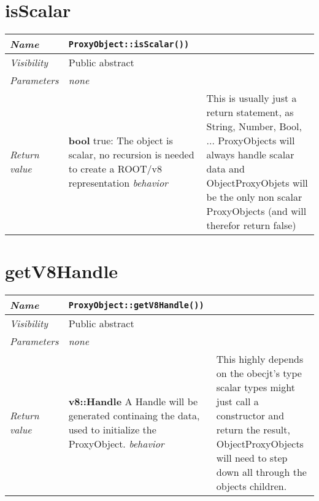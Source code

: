 \section{isScalar}
\begin{longtable}{p{3cm} @{\hskip 1cm} p{12cm}}
  \hline
  \textit{Name} & \texttt{ProxyObject::isScalar())} \\
  \hline
  \textit{Visibility} & Public abstract \\
  \hline
  \textit{Parameters} & \textit{none} \\
  \hline
  \textit{Return value} & \textbf{bool} true: The object is scalar, no recursion is needed to create a ROOT/v8 representation
  \hline
  \textit{behavior} & This is usually just a return statement, as String, Number, Bool, ... ProxyObjects will always handle scalar data and ObjectProxyObjets will be the only non scalar ProxyObjects (and will therefor return false) \\
  \hline
\end{longtable}
\section{getV8Handle}
\begin{longtable}{p{3cm} @{\hskip 1cm} p{12cm}}
  \hline
  \textit{Name} & \texttt{ProxyObject::getV8Handle())} \\
  \hline
  \textit{Visibility} & Public abstract \\
  \hline
  \textit{Parameters} & \textit{none} \\
  \hline
  \textit{Return value} & \textbf{v8::Handle} A Handle will be generated continaing the data, used to initialize the ProxyObject.
  \hline
  \textit{behavior} & This highly depends on the obecjt's type scalar types might just call a constructor and return the result, ObjectProxyObjects will need to step down all through the objects children.
  \hline
\end{longtable}
